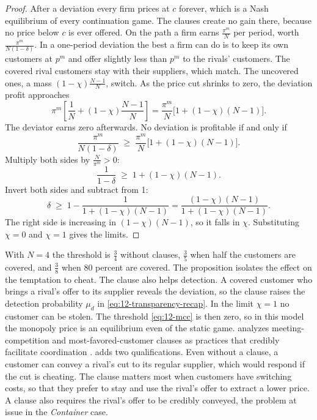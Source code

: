 \begin{proof}
After a deviation every firm prices at $c$ forever, which is a Nash equilibrium of every continuation game. The
clauses create no gain there, because no price below $c$ is ever offered. On the path a firm earns
$\frac{\pi^m}{N}$ per period, worth $\frac{\pi^m}{N(1-\delta)}$. In a one-period deviation the best a firm can do
is to keep its own customers at $p^m$ and offer slightly less than $p^m$ to the rivals' customers. The covered
rival customers stay with their suppliers, which match. The uncovered ones, a mass $(1-\chi)\frac{N-1}{N}$,
switch. As the price cut shrinks to zero, the deviation profit approaches
\begin{equation*}
  \pi^m\left[\frac{1}{N} + (1-\chi)\frac{N-1}{N}\right] = \frac{\pi^m}{N}\bigl[1 + (1-\chi)(N-1)\bigr] .
\end{equation*}
The deviator earns zero afterwards. No deviation is profitable if and only if
\begin{equation*}
  \frac{\pi^m}{N(1-\delta)} \;\ge\; \frac{\pi^m}{N}\bigl[1 + (1-\chi)(N-1)\bigr] .
\end{equation*}
Multiply both sides by $\frac{N}{\pi^m} > 0$:
\begin{equation*}
  \frac{1}{1-\delta} \;\ge\; 1 + (1-\chi)(N-1) .
\end{equation*}
Invert both sides and subtract from 1:
\begin{equation*}
  \delta \;\ge\; 1 - \frac{1}{1 + (1-\chi)(N-1)} = \frac{(1-\chi)(N-1)}{1 + (1-\chi)(N-1)} .
\end{equation*}
The right side is increasing in $(1-\chi)(N-1)$, so it falls in $\chi$. Substituting $\chi = 0$ and $\chi = 1$
gives the limits.
\end{proof}

With $N = 4$ the threshold is $\frac{3}{4}$ without clauses, $\frac{3}{5}$ when half the customers are covered,
and $\frac{3}{8}$ when 80 percent are covered. The proposition isolates the effect on the temptation to cheat. The
clause also helps detection. A covered customer who brings a rival's offer to its supplier reveals the deviation,
so the clause raises the detection probability $\mu_d$ in \eqref{eq:12-transparency-recap}. In the limit
$\chi = 1$ no customer can be stolen. The threshold \eqref{eq:12-mcc} is then zero, so in this model the monopoly price
is an equilibrium even of the static game. \citet{Salop1986} analyzes meeting-competition and most-favored-customer
clauses as practices that credibly facilitate coordination \citep[p.~284, notes~69 and~71]{Kaplow2013}.
\citet[p.~284]{Kaplow2013} adds two qualifications. Even without a clause, a customer can convey a rival's cut to
its regular supplier, which would respond if the cut is cheating. The clause matters most when customers have
switching costs, so that they prefer to stay and use the rival's offer to extract a lower price. A clause also
requires the rival's offer to be credibly conveyed, the problem at issue in the \textit{Container} case.

